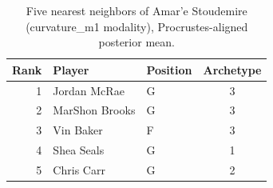 \begin{table}[htbp]
  \centering\small
  \begin{tabular}{rllc}
    \toprule
    Rank & Player & Position & Archetype \\
    \midrule
    1 & Jordan McRae & G & 3 \\
    2 & MarShon Brooks & G & 3 \\
    3 & Vin Baker & F & 3 \\
    4 & Shea Seals & G & 1 \\
    5 & Chris Carr & G & 2 \\
    \bottomrule
  \end{tabular}
  \caption{Five nearest neighbors of Amar'e Stoudemire (curvature_m1 modality), Procrustes-aligned posterior mean.}
  \label{tab:Amar_e_Stoudemire_neighbors_curvature_m1}
\end{table}

